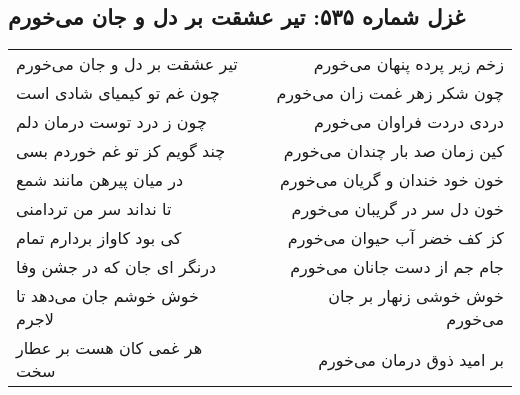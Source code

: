 \begin{center}
\section*{غزل شماره ۵۳۵: تیر عشقت بر دل و جان می‌خورم}
\label{sec:535}
\begin{longtable}{l p{0.5cm} r}
تیر عشقت بر دل و جان می‌خورم
&&
زخم زیر پرده پنهان می‌خورم
\\
چون غم تو کیمیای شادی است
&&
چون شکر زهر غمت زان می‌خورم
\\
چون ز درد توست درمان دلم
&&
دردی دردت فراوان می‌خورم
\\
چند گویم کز تو غم خوردم بسی
&&
کین زمان صد بار چندان می‌خورم
\\
در میان پیرهن مانند شمع
&&
خون خود خندان و گریان می‌خورم
\\
تا نداند سر من تردامنی
&&
خون دل سر در گریبان می‌خورم
\\
کی بود کاواز بردارم تمام
&&
کز کف خضر آب حیوان می‌خورم
\\
درنگر ای جان که در جشن وفا
&&
جام جم از دست جانان می‌خورم
\\
خوش خوشم جان می‌دهد تا لاجرم
&&
خوش خوشی زنهار بر جان می‌خورم
\\
هر غمی کان هست بر عطار سخت
&&
بر امید ذوق درمان می‌خورم
\\
\end{longtable}
\end{center}

